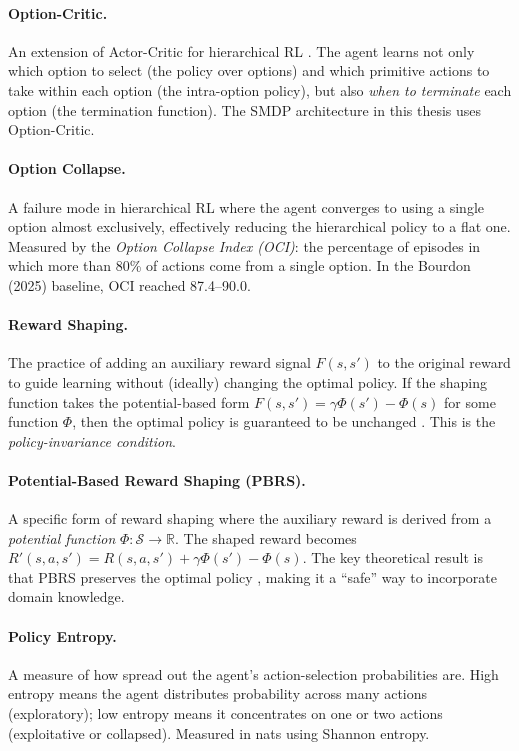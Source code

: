 \documentclass[12pt,a4paper]{article}
\begin{document}
\paragraph{Option-Critic.}
An extension of Actor-Critic for hierarchical RL \citep{bacon2017}. The agent learns not only which option to select (the policy over options) and which primitive actions to take within each option (the intra-option policy), but also \emph{when to terminate} each option (the termination function). The SMDP architecture in this thesis uses Option-Critic.

\paragraph{Option Collapse.}
A failure mode in hierarchical RL where the agent converges to using a single option almost exclusively, effectively reducing the hierarchical policy to a flat one. Measured by the \emph{Option Collapse Index (OCI)}: the percentage of episodes in which more than 80\% of actions come from a single option. In the Bourdon (2025) baseline, OCI reached 87.4--90.0.

\paragraph{Reward Shaping.}
The practice of adding an auxiliary reward signal $F(s, s')$ to the original reward to guide learning without (ideally) changing the optimal policy. If the shaping function takes the potential-based form $F(s, s') = \gamma \Phi(s') - \Phi(s)$ for some function $\Phi$, then the optimal policy is guaranteed to be unchanged \citep{ng1999}. This is the \emph{policy-invariance condition}.

\paragraph{Potential-Based Reward Shaping (PBRS).}
A specific form of reward shaping where the auxiliary reward is derived from a \emph{potential function} $\Phi: \mathcal{S} \to \mathbb{R}$. The shaped reward becomes $R'(s, a, s') = R(s, a, s') + \gamma \Phi(s') - \Phi(s)$. The key theoretical result is that PBRS preserves the optimal policy \citep{ng1999}, making it a ``safe'' way to incorporate domain knowledge.

\paragraph{Policy Entropy.}
A measure of how spread out the agent's action-selection probabilities are. High entropy means the agent distributes probability across many actions (exploratory); low entropy means it concentrates on one or two actions (exploitative or collapsed). Measured in nats using Shannon entropy.
\end{document}

